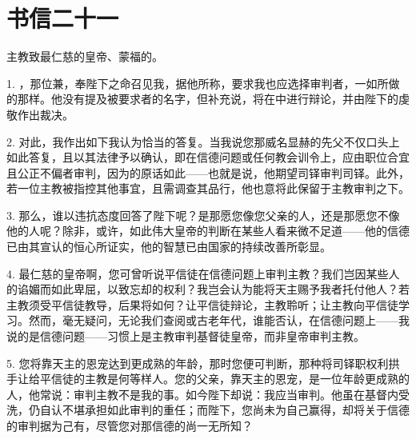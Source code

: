 
\section{书信二十一}

\par

主教致最仁慈的皇帝、蒙福的。\par

1. ，那位兼，奉陛下之命召见我，据他所称，要求我也应选择审判者，一如所做的那样。他没有提及被要求者的名字，但补充说，将在中进行辩论，并由陛下的虔敬作出裁决。\par

2. 对此，我作出如下我认为恰当的答复。当我说您那威名显赫的先父不仅口头上如此答复，且以其法律予以确认，即在信德问题或任何教会训令上，应由职位合宜且公正不偏者审判，因为的原话如此——也就是说，他期望司铎审判司铎。此外，若一位主教被指控其他事宜，且需调查其品行，他也意将此保留于主教审判之下。\par

3. 那么，谁以违抗态度回答了陛下呢？是那愿您像您父亲的人，还是那愿您不像他的人呢？除非，或许，如此伟大皇帝的判断在某些人看来微不足道——他的信德已由其宣认的恒心所证实，他的智慧已由国家的持续改善所彰显。\par

4. 最仁慈的皇帝啊，您可曾听说平信徒在信德问题上审判主教？我们岂因某些人的谄媚而如此卑屈，以致忘却的权利？我岂会认为能将天主赐予我者托付他人？若主教须受平信徒教导，后果将如何？让平信徒辩论，主教聆听；让主教向平信徒学习。然而，毫无疑问，无论我们查阅或古老年代，谁能否认，在信德问题上——我说的是信德问题——习惯上是主教审判基督徒皇帝，而非皇帝审判主教。\par

5. 您将靠天主的恩宠达到更成熟的年龄，那时您便可判断，那种将司铎职权利拱手让给平信徒的主教是何等样人。您的父亲，靠天主的恩宠，是一位年龄更成熟的人，他常说：审判主教不是我的事。如今陛下却说：我应当审判。他虽在基督内受洗，仍自认不堪承担如此审判的重任；而陛下，您尚未为自己赢得，却将关于信德的审判据为己有，尽管您对那信德的尚一无所知？\par

